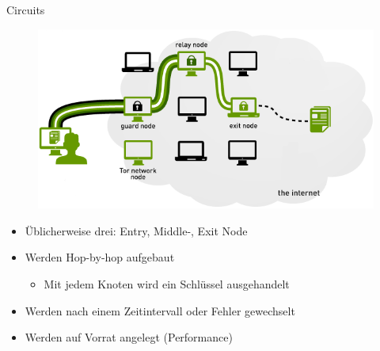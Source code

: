 \documentclass{beamer}
\begin{document}


\begin{frame}{Circuits}{\secname}
  \begin{figure}
    \includegraphics[width=.7\textwidth]{pics/tor}
  \end{figure}
  \begin{itemize}
    \item Üblicherweise drei: Entry\-, Middle-, Exit Node
    \item Werden Hop-by-hop aufgebaut
    \begin{itemize}
      \item Mit jedem Knoten wird ein Schlüssel ausgehandelt
    \end{itemize}
    \item Werden nach einem Zeitintervall oder Fehler gewechselt
    \item Werden auf Vorrat angelegt (Performance)
  \end{itemize}
\end{frame}
\end{document}
